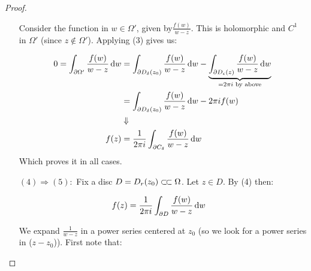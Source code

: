\begin{proof}
\begin{enumerate}
\begin{center}
    \end{center}
    
    Consider the function in $w\in\Omega'$, given by$\frac{f(w)}{w-z}$. This is holomorphic and $C^1$ in $\Omega'$ (since $z \notin \Omega'$). Applying (3) gives us:
    
    \begin{align*}
        0 = \int_{\partial \Omega'} \frac{f(w)}{w-z}  \dif w &= \int_{\partial D_\delta (z_0)} \frac{f(w)}{w-z}  \dif w - \underbrace{\int_{\partial D_\epsilon (z)} \frac{f(w)}{w-z}  \dif w}_{=2\pi i  \text{ by above}}\\
        &= \int_{\partial D_\delta (z_0)} \frac{f(w)}{w-z}  \dif w - 2\pi i f(w)\\
        &\Downarrow\\
        f(z) &= \frac{1}{2\pi i}\int_{\partial C_\delta} \frac{f(w)}{w-z} \dif w
    \end{align*}
    Which proves it in all cases.
    
    
\item[$(4) \Rightarrow (5):$] Fix a disc $D= D_r(z_0) \ssubset \Omega$. Let $z\in D$. By (4) then:

\begin{align*}
    f(z) &= \frac{1}{2\pi i} \int_{\partial D} \frac{f(w)}{w-z}  \dif w
\end{align*}
    
We expand $\frac{1}{w-z}$ in a power series centered at $z_0$ (so we look for a power series in ($z-z_0$)). First note that:


\end{enumerate}
\end{proof}
